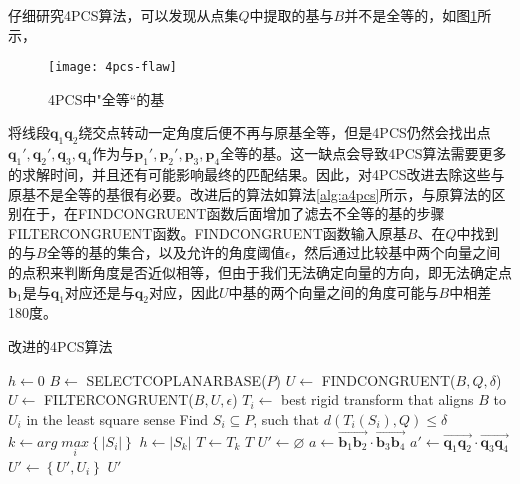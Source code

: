 仔细研究4PCS算法，可以发现从点集$Q$中提取的基与$B$并不是全等的，如图\ref{fig:4pcs-flaw}所示，
\begin{figure}[ht]
  \centering
  \texttt{[image: 4pcs-flaw]}
  \caption{4PCS中"全等“的基}
  \label{fig:4pcs-flaw}
\end{figure}
将线段$\mathbf{q}_1\mathbf{q}_2$绕交点转动一定角度后便不再与原基全等，但是4PCS仍然会找出点$\mathbf{q}_1',\mathbf{q}_2',\mathbf{q}_3,\mathbf{q}_4$作为与$\mathbf{p}_1',\mathbf{p}_2',\mathbf{p}_3,\mathbf{p}_4$全等的基。这一缺点会导致4PCS算法需要更多的求解时间，并且还有可能影响最终的匹配结果。因此，对4PCS改进去除这些与原基不是全等的基很有必要。改进后的算法如算法\ref{alg:a4pcs}所示，与原算法的区别在于，在FINDCONGRUENT函数后面增加了滤去不全等的基的步骤FILTERCONGRUENT函数。FINDCONGRUENT函数输入原基$B$、在$Q$中找到的与$B$全等的基的集合，以及允许的角度阈值$\epsilon$，然后通过比较基中两个向量之间的点积来判断角度是否近似相等，但由于我们无法确定向量的方向，即无法确定点$\mathbf{b}_1$是与$\mathbf{q}_1$对应还是与$\mathbf{q}_2$对应，因此$U$中基的两个向量之间的角度可能与$B$中相差180度。
\begin{algorithm}
  \caption{改进的4PCS算法}
  \label{alg:a4pcs}
  $h\leftarrow 0$\;
   {
    $B\leftarrow$ SELECTCOPLANARBASE($P$)\;
    $U\leftarrow$ FINDCONGRUENT($B,Q,\delta$)\;
    $U\leftarrow$ FILTERCONGRUENT($B,U,\epsilon$)\;
     {
      $T_i\leftarrow$ best rigid transform that aligns $B$ to $U_i$ in the least square sense\;
      Find $S_i\subseteq P$, such that $d(T_i(S_i), Q)\leq\delta$\;
    }
    $k\leftarrow arg\;\underset{i}{max}\left\{|S_i|\right\}$\;
     {
      $h\leftarrow |S_k|$\;
      $T\leftarrow T_k$\;
    }
    \Return $T$\;
  }
  \BlankLine
  \BlankLine
  \BlankLine
  \BlankLine
   {
    $U'\leftarrow \varnothing$\;
    $a\leftarrow \overrightarrow{\mathbf{b}_1\mathbf{b}_2}\cdot \overrightarrow{\mathbf{b}_3\mathbf{b}_4}$\;
     {
      $a'\leftarrow \overrightarrow{\mathbf{q}_1\mathbf{q}_2}\cdot \overrightarrow{\mathbf{q}_3\mathbf{q}_4}$\;
       {
        $U'\leftarrow \left\{U',U_i\right\}$\;
      }
    }
    \Return $U'$\;
  }
\end{algorithm}

